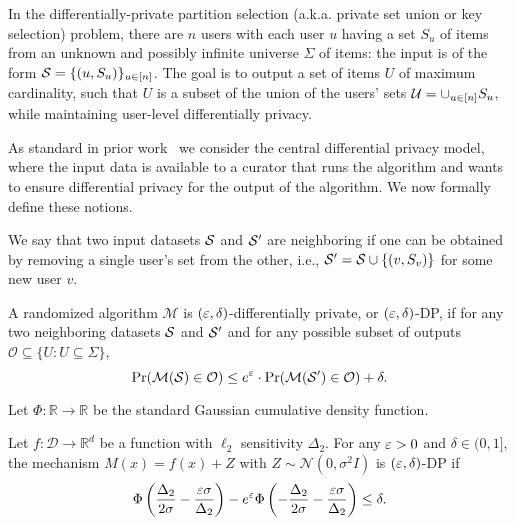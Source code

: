 \begin{definition}
In the differentially-private partition selection (a.k.a. private set union or key selection) problem, there are $n$ users with each user $u$ having a set $S_u$ of items from an unknown and possibly infinite universe $\Sigma$ of items: the input is of the form $\mathcal{S} = \{(u, S_u)\}_{u \in[n]}$. The goal is to output a set of items $U$ of maximum cardinality, such that $U$ is a subset of the union of the users' sets $\mathcal{U}=\cup_{u \in [n]} S_u$,  while maintaining user-level differentially privacy.
\end{definition}
As standard in prior work~\cite{korolova2009releasing, gopi2020dpunion, carvalho2022incorporatingitem, swanberg2023dpsips} we consider the central differential privacy model, where the input data is available to a curator that runs the algorithm and wants to ensure differential privacy for the output of the algorithm. We now formally define these notions.

\begin{definition}
We say that two input datasets $\mathcal{S}$ and $\mathcal{S}'$ are neighboring if one can be obtained by removing a single user's set from the other, i.e., $\mathcal{S}' = \mathcal{S} \cup \{(v, S_v)\}$ for some new user $v$.
\end{definition}

\begin{definition}
A randomized algorithm $\mathcal{M}$ is $(\varepsilon, \delta)$-differentially private, or $(\varepsilon, \delta)$-DP, if for any two neighboring datasets $\mathcal{S}$ and $\mathcal{S}'$ and for any possible subset of outputs $\mathcal{O} \subseteq \{U: U \subseteq \Sigma \}$,
\[
    \Pr(\mathcal{M}(\mathcal{S}) \in \mathcal{O}) \leq e^\varepsilon \cdot \Pr(\mathcal{M}(\mathcal{S}') \in \mathcal{O}) + \delta.
\]
\end{definition}

Let $\Phi: \mathbb{R} \to \mathbb{R}$ be the standard Gaussian cumulative density function.

\begin{proposition}\label{prop:gaussian}
Let $f: \mathcal{D} \to \mathbb{R}^d$ be a function with $\ell_2$ sensitivity $\Delta_2$. For any $\varepsilon > 0$ and $\delta \in (0,1]$, the mechanism $M(x) = f(x) + Z$ with $Z \sim \mathcal{N}(0, \sigma^2 I)$ is $(\varepsilon, \delta)$-DP if
\begin{equation*}
    \Phi\left(\frac{\Delta_2}{2\sigma} - \frac{\varepsilon \sigma}{\Delta_2}\right) - e^{\varepsilon} \Phi\left(-\frac{\Delta_2}{2\sigma} - \frac{\varepsilon \sigma}{\Delta_2}\right) \leq \delta.
\end{equation*}
\end{proposition}
